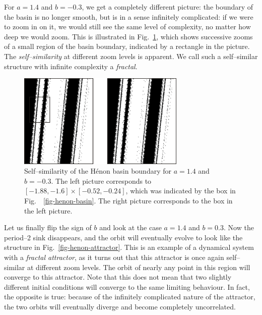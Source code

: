 For $a=1.4$ and $b=-0.3$, we get a completely different picture: the boundary of the basin is no longer smooth, but is in a sense infinitely complicated: if we were to zoom in on it, we would still see the same level of complexity, no matter how deep we would zoom. This is illustrated in Fig.~\ref{fig-henon-zoom}, which shows successive zooms of a small region of the basin boundary, indicated by a rectangle in the picture. The \emph{self--similarity} at different zoom levels is apparent. We call such a self--similar structure with infinite complexity a \emph{fractal}.

\begin{figure}
\centering
\includegraphics[width=8cm]{dynamic/figures/henon_zoom}
\caption{Self--similarity of the H\'{e}non basin boundary for $a=1.4$ and $b=-0.3$. The left picture corresponds to $[-1.88,-1.6] \times [-0.52,-0.24]$, which was indicated by the box in Fig.~~\ref{fig-henon-basin}. The right picture corresponds to the box in the left picture.}
\label{fig-henon-zoom}
\end{figure} 

Let us finally flip the sign of $b$ and look at the case $a=1.4$ and $b=0.3$. Now the period--2 sink disappears, and the orbit will eventually evolve to look like the structure in Fig.~\ref{fig-henon-attractor}. This is an example of a dynamical system with a \emph{fractal attractor}, as it turns out that this attractor is once again self--similar at different zoom levels. The orbit of nearly any point in this region will converge to this attractor. Note that this does not mean that two slightly different initial conditions will converge to the same limiting behaviour. In fact, the opposite is true: because of the infinitely complicated nature of the attractor, the two orbits will eventually diverge and become completely uncorrelated.

